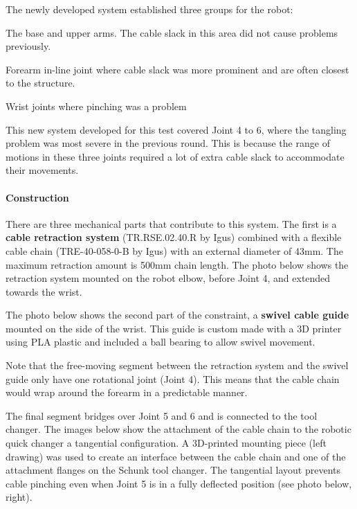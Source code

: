 The newly developed system established three groups for the robot:

\begin{description}[style=unboxed] %
	\item [Joint 1 to 3] The base and upper arms. The cable slack in this area did not cause problems previously.
	\item [Joint 4] Forearm in-line joint where cable slack was more prominent and are often closest to the structure.
	\item [Joint 5 and 6] Wrist joints where pinching was a problem
\end{description}

This new system developed for this test covered Joint 4 to 6, where the tangling problem was most severe in the previous round. This is because the range of motions in these three joints required a lot of extra cable slack to accommodate their movements. 

\paragraph{Construction}

There are three mechanical parts that contribute to this system. The first is a \textbf{cable retraction system} (TR.RSE.02.40.R by Igus) combined with a flexible cable chain (TRE-40-058-0-B by Igus) with an external diameter of 43mm. The maximum retraction amount is 500mm chain length. The photo below shows the retraction system mounted on the robot elbow, before Joint 4, and extended towards the wrist.





The photo below shows the second part of the constraint, a \textbf{swivel cable guide} mounted on the side of the wrist. This guide is custom made with a 3D printer using PLA plastic and included a ball bearing to allow swivel movement. 

Note that the free-moving segment between the retraction system and the swivel guide only have one rotational joint (Joint 4). This means that the cable chain would wrap around the forearm in a predictable manner. 



The final segment bridges over Joint 5 and 6 and is connected to the tool changer. The images below show the attachment of the cable chain to the robotic quick changer a tangential configuration. A 3D-printed mounting piece (left drawing) was used to create an interface between the cable chain and one of the attachment flanges on the Schunk tool changer. The tangential layout prevents cable pinching even when Joint 5 is in a fully deflected position (see photo below, right). 

